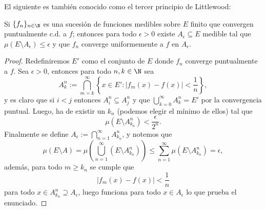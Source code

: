El siguiente es también conocido como el tercer principio de Littlewood:
\begin{thmi}
	Si $\{f_n\}_{n\in\N}$ es una sucesión de funciones medibles sobre $E$ finito que convergen puntualmente c.d. a $f$;
	entonces para todo $\epsilon > 0$ existe $A_\epsilon \subseteq E$ medible tal que $\mu(E \setminus A_\epsilon) \le \epsilon$
	y que $f_n$ converge uniformemente a $f$ en $A_\epsilon$.
\end{thmi}
\begin{proof}
	Redefiniremos $E'$ como el conjunto de $E$ donde $f_n$ converge puntualmente a $f$.
	Sea $\epsilon > 0$, entonces para todo $n,k\in\N$ sea
	$$ A_k^n := \bigcap_{m=k}^\infty \left\{ x\in E':|f_m(x) - f(x)| < \frac{1}{n} \right\}, $$
	y es claro que si $i < j$ entonces $A_i^n \subseteq A_j^n$ y que $\bigcup_{k=0}^\infty A_k^n = E'$ por la convergencia puntual.
	Luego, ha de existir un $k_n$ (podemos elegir el mínimo de ellos) tal que
	$$ \mu(E \setminus A^n_{k_n}) < \frac{\epsilon}{2^n}. $$
	Finalmente se define $A_\epsilon := \bigcap_{n=1}^\infty A^n_{k_n}$, y notemos que
	$$ \mu(E\setminus A) = \mu\left( \bigcup_{n=1}^\infty (E\setminus A^n_{k_n}) \right) \le \sum_{n=1}^\infty \mu(E\setminus A^n_{k_n}) = \epsilon, $$
	además, para todo $m\ge k_n$ se cumple que
	$$ |f_m(x) - f(x)| < \frac{1}{n} $$
	para todo $x\in A^n_{k_n} \supseteq A_\epsilon$, luego funciona para todo $x\in A_\epsilon$ lo que prueba el enunciado.
\end{proof}

